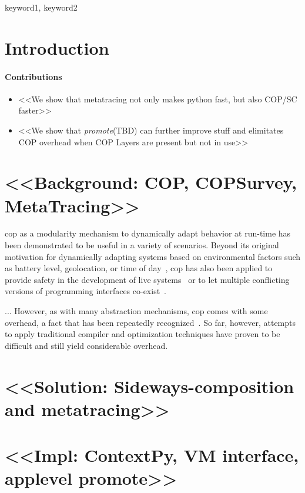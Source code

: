 \documentclass[preprint,english,10pt,nonatbib]{sigplanconf}
\begin{document}

\keywords
keyword1, keyword2

\section{Introduction}

\paragraph*{Contributions}

\begin{itemize}
\item <<We show that metatracing not only makes python fast, but also COP/SC
  faster>>
\item <<We show that \emph{promote}(TBD) can further improve stuff and
  elimitates COP overhead when COP Layers are present but not in use>>
\end{itemize}

\section{<<Background: COP, COPSurvey, MetaTracing>>}

\ac{cop} as a modularity mechanism to dynamically adapt behavior at run-time has
been demonstrated to be useful in a variety of scenarios. Beyond its original
motivation for dynamically adapting systems based on environmental factors such
as battery level, geolocation, or time of day~, \ac{cop} has also
been applied to provide safety in the development of live
systems~\cite{lincke+:2012:scoping-changes} or to let multiple conflicting
versions of programming interfaces co-exist~. 

... %
However, as with many abstraction mechanisms, \ac{cop} comes with some overhead,
a fact that has been repeatedly
recognized~\cite{springer2015efficient,appeltauer2010layered}. So far, however,
attempts to apply traditional compiler and optimization techniques have proven
to be difficult and still yield considerable overhead.

\section{<<Solution: Sideways-composition and metatracing>>}
\section{<<Impl: ContextPy, VM interface, applevel promote>>}
\end{document}
